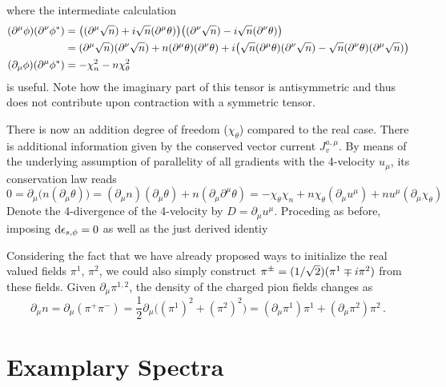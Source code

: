where the intermediate calculation
\begin{subequations}
    \begin{align}
        (\partial^\mu\phi)(\partial^\nu\phi^*)&=\big((\partial^\mu\sqrt{n})+{i}\sqrt{n}(\partial^\mu\theta)\big)\big((\partial^\nu\sqrt{n})-{i}\sqrt{n}(\partial^\nu\theta)\big)\\
        &=(\partial^\mu\sqrt{n})(\partial^\nu\sqrt{n})+n(\partial^\mu\theta)(\partial^\nu\theta)+{i}\big(\sqrt{n}(\partial^\mu\theta)(\partial^\nu\sqrt{n})-\sqrt{n}(\partial^\nu\theta)(\partial^\mu\sqrt{n})\big)\\
        (\partial_\mu\phi)(\partial^\mu\phi^*)&=-\chi_n^2-n\chi_\theta^2
    \end{align}
\end{subequations}
is useful. Note how the imaginary part of this tensor is antisymmetric and thus does not contribute upon contraction with a symmetric tensor.

There is now an addition degree of freedom ($\chi_\theta$) compared to the real case. There is additional information given by the conserved vector current $J_v^{a,\mu}$. By means of the underlying assumption of parallelity of all gradients with the 4-velocity $u_\mu$, its conservation law reads
\begin{equation}
        0=\partial_\mu\big(n(\partial_\mu\theta)\big)=(\partial_\mu n)(\partial_\mu\theta)+n(\partial_\mu\partial^\mu\theta)=-\chi_\theta\chi_n+n\chi_\theta(\partial_\mu u^\mu)+nu^\mu(\partial_\mu\chi_\theta)
\end{equation}
Denote the 4-divergence of the 4-velocity by ${D=\partial_\mu u^\mu}$. Proceding as before, imposing ${\text{d}\epsilon_{s,\phi}=0}$ as well as the just derived identiy

Considering the fact that we have already proposed ways to initialize the real valued fields $\pi^1$, $\pi^2$, we could also simply construct $\pi^\pm=(1/\sqrt{2})(\pi^1\mp{i}\pi^2)$ from these fields. Given $\partial_\mu\pi^{1,2}$, the density of the charged pion fields changes as
\begin{equation}
    \partial_\mu n=\partial_\mu(\pi^+\pi^-)=\frac{1}{2}\partial_\mu\big((\pi^1)^2+(\pi^2)^2\big)=(\partial_\mu\pi^1)\pi^1+(\partial_\mu\pi^2)\pi^2\,.
\end{equation}

\section{Examplary Spectra}
\label{sec:ExampleSpectra}

